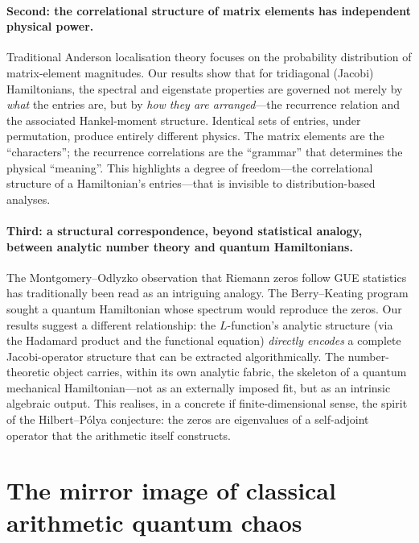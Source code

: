 \documentclass[aps,prx,reprint,floatfix]{revtex4-2}
\begin{document}
\paragraph{Second: the correlational structure of matrix elements has
independent physical power.}
Traditional Anderson localisation theory focuses on the probability
distribution of matrix-element magnitudes. Our results show that for
tridiagonal (Jacobi) Hamiltonians, the spectral and eigenstate properties
are governed not merely by \emph{what} the entries are, but by \emph{how
they are arranged}---the recurrence relation and the associated Hankel-moment
structure. Identical sets of entries, under permutation, produce entirely
different physics. The matrix elements are the ``characters''; the recurrence
correlations are the ``grammar'' that determines the physical ``meaning''.
This highlights a degree of freedom---the correlational structure of a
Hamiltonian's entries---that is invisible to distribution-based analyses.

\paragraph{Third: a structural correspondence, beyond statistical analogy,
between analytic number theory and quantum Hamiltonians.}
The Montgomery--Odlyzko observation that Riemann zeros follow GUE statistics
has traditionally been read as an intriguing analogy. The Berry--Keating
program sought a quantum Hamiltonian whose spectrum would reproduce the
zeros. Our results suggest a different relationship: the $L$-function's
analytic structure (via the Hadamard product and the functional equation)
\emph{directly encodes} a complete Jacobi-operator structure that can be
extracted algorithmically. The number-theoretic object carries, within its
own analytic fabric, the skeleton of a quantum mechanical Hamiltonian---not
as an externally imposed fit, but as an intrinsic algebraic output. This
realises, in a concrete if finite-dimensional sense, the spirit of the
Hilbert--P\'olya conjecture: the zeros are eigenvalues of a self-adjoint
operator that the arithmetic itself constructs.

\section{The mirror image of classical arithmetic quantum chaos}
\label{sec:mirror}
\end{document}
